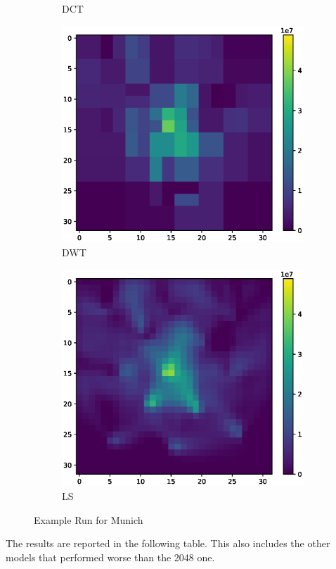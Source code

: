 \begin{figure}
\begin{subfigure}[b]{0.32\textwidth}
        \caption{DCT}
    \end{subfigure}    
    \begin{subfigure}[b]{0.32\textwidth}
        \includegraphics[width=\textwidth]{figures/06_results/gaussian_plume_example/munich/bp_dwt_snr_20_db.eps}
        \caption{DWT}
    \end{subfigure}
    \begin{subfigure}[b]{0.32\textwidth}
        \includegraphics[width=\textwidth]{figures/06_results/gaussian_plume_example/munich/least_squares_snr_20_db.eps}
        \caption{LS}
    \end{subfigure}
    \caption{Example Run for Munich}
\end{figure}
The results are reported in the following table.
This also includes the other models that performed worse than the 2048 one.

